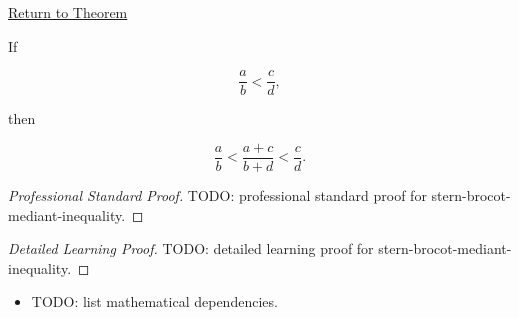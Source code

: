 \newpage
{}
\label{prf:stern-brocot-mediant-inequality}

\begin{remark*}[Return]
\hyperref[prop:stern-brocot-mediant-inequality]{Return to Theorem}
\end{remark*}

\begin{proposition*}
If

\[
\frac{a}{b} < \frac{c}{d},
\]

then

\[
\frac{a}{b}
<
\frac{a+c}{b+d}
<
\frac{c}{d}.
\]
\end{proposition*}

\begin{proof}[Professional Standard Proof]
\LRAProofBodyStart
TODO: professional standard proof for stern-brocot-mediant-inequality.
\end{proof}

\begin{proof}[Detailed Learning Proof]
\LRAProofBodyStart
TODO: detailed learning proof for stern-brocot-mediant-inequality.
\end{proof}

\begin{remark*}
\end{remark*}

\begin{dependencies}
\begin{itemize}
  \item TODO: list mathematical dependencies.
\end{itemize}
\end{dependencies}

\clearpage
